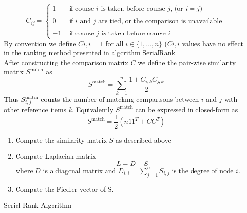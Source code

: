 \documentclass[10pt]{siamltex}
\newcounter{ale}
\begin{document}
\begin{pagewiselinenumbers}
\begin{equation}
C_{ij} = \left\{
	\begin{array}{rl}
 1 & \text{ if course $i$ is taken before course $j$, (or $i=j$)} 	\\
 &  \\
 0 & \text{ if $i$ and $j$ are tied, or the comparison is unavailable }	\\
 &  \\
 -1 & \text{ if course $j$ is taken before course $i$} 
     \end{array}
   \right.
\label{comparisonMatrix}
\end{equation}
By convention we define $Ci,i = 1$ for all $i \in \{1, \dots, n\}$ ($Ci,i$ values have no effect in the
ranking method presented in algorithm SerialRank.\\
After constructing the comparison matrix $C$ we define the pair-wise similarity matrix $S^{\text{match}}$ as $$S^{\text{match}} = \sum_{k = 1}^{n} \frac{1+C_{i, k}C_{j, k}}{2}$$
Thus $S^{\text{match}}_{i, j}$ counts the number of matching comparisons between $i$ and $j$ with other reference
items $k$. Equivalently $S^{\text{match}}$ can be expressed in closed-form as $$S^{\text{match}} = \frac{1}{2}(n11^T + CC^T)$$
\begin{algorithm}[H]
\begin{enumerate}
\item Compute the similarity matrix $S$ as described above
\item Compute Laplacian matrix $$L = D - S$$ where $D$ is a diagonal matrix and $D_{i, i} = \sum_{j = 1}^{n}S_{i, j}$ is the degree of node $i$.
\item Compute the Fiedler vector of S.
\end{enumerate}
 \caption{Serial Rank Algorithm}
\end{algorithm}


\end{pagewiselinenumbers}
\end{document}
